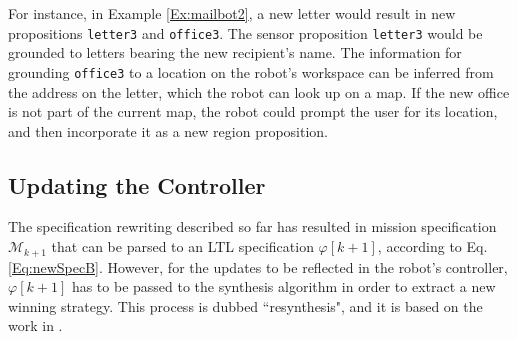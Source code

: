 For instance, in Example \ref{Ex:mailbot2}, a new letter would result in new propositions \texttt{letter3} and \texttt{office3}. The sensor proposition \texttt{letter3} would be grounded to letters bearing the new recipient's name. The information for grounding \texttt{office3} to a location on the robot's workspace can be inferred from the address on the letter, which the robot can look up on a map. If the new office is not part of the current map, the robot could prompt the user for its location, and then incorporate it as a new region proposition.

\subsection{Updating the Controller}

The specification rewriting described so far has resulted in mission specification $\mathcal{M}_{k+1}$ that can be parsed to an LTL specification $\varphi [k+1]$, according to Eq. \eqref{Eq:newSpecB}. However, for the updates to be reflected in the robot's controller, $\varphi [k+1]$ has to be passed to the synthesis algorithm in order to extract a new winning strategy. This process is dubbed ``resynthesis", and it is based on the work in \cite{BingxinRSS2012}.


